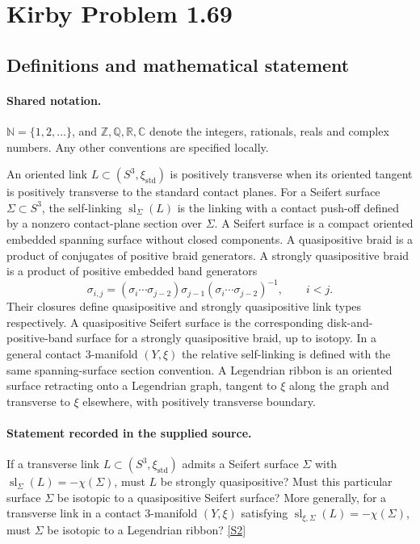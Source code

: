 \documentclass[11pt]{article}
\newcommand{\sref}[2]{\hyperlink{source:#1:#2}{[S#2]}}
\begin{document}
\section{Kirby Problem 1.69}\label{statement}

\subsection{Definitions and mathematical statement}

\paragraph{Shared notation.}$\mathbb N=\{1,2,\ldots\}$, and $\mathbb Z,\mathbb Q,\mathbb R,\mathbb C$ denote the integers, rationals, reals and complex numbers. Any other conventions are specified locally.


An oriented link $L\subset(S^3,\xi_{\mathrm{std}})$ is positively transverse when its oriented tangent is positively transverse to the standard contact planes. For a Seifert surface $\Sigma\subset S^3$, the self-linking $\operatorname{sl}_\Sigma(L)$ is the linking with a contact push-off defined by a nonzero contact-plane section over $\Sigma$. A Seifert surface is a compact oriented embedded spanning surface without closed components. A quasipositive braid is a product of conjugates of positive braid generators. A strongly quasipositive braid is a product of positive embedded band generators
\[\sigma_{i,j}=(\sigma_i\cdots\sigma_{j-2})\sigma_{j-1}(\sigma_i\cdots\sigma_{j-2})^{-1},\qquad i<j.\]
Their closures define quasipositive and strongly quasipositive link types respectively. A quasipositive Seifert surface is the corresponding disk-and-positive-band surface for a strongly quasipositive braid, up to isotopy. In a general contact 3-manifold $(Y,\xi)$ the relative self-linking is defined with the same spanning-surface section convention. A Legendrian ribbon is an oriented surface retracting onto a Legendrian graph, tangent to $\xi$ along the graph and transverse to $\xi$ elsewhere, with positively transverse boundary.
\paragraph{Statement recorded in the supplied source.}
If a transverse link $L\subset(S^3,\xi_{\mathrm{std}})$ admits a Seifert surface $\Sigma$ with $\operatorname{sl}_\Sigma(L)=-\chi(\Sigma)$, must $L$ be strongly quasipositive? Must this particular surface $\Sigma$ be isotopic to a quasipositive Seifert surface? More generally, for a transverse link in a contact 3-manifold $(Y,\xi)$ satisfying $\operatorname{sl}_{\xi,\Sigma}(L)=-\chi(\Sigma)$, must $\Sigma$ be isotopic to a Legendrian ribbon? \sref{statement}{2}
\end{document}
